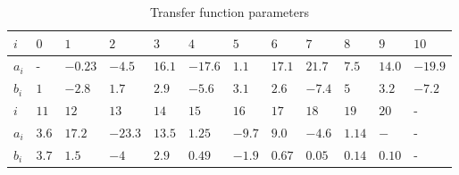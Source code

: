 \begin{table}[h!]
  \centering
  \begin{tabular}{| l | l | l | l | l | l | l | l | l | l | l | l |}
    \hline
    $i$   & $0$ & $1$ & $2$ & $3$ & $4$ & $5$ & $6$ & $7$ & $8$ & $9$ & $10$\\ \hline
    $a_i$ & -   & $-0.23$ & $-4.5$ & $16.1$ & $-17.6$ & $1.1$ & $17.1$ & $21.7$ & $7.5$ & $14.0$ & $-19.9$\\
    $b_i$ & $1$ & $-2.8$ & $1.7$ & $2.9$ & $-5.6$ & $3.1$ & $2.6$ & $-7.4$ & $5$ & $3.2$ & $-7.2$ \\ \hline
    $i$   & $11$ & $12$ & $13$ & $14$ & $15$ & $16$ & $17$ & $18$ & $19$ & $20$ & -\\ \hline
    $a_i$ & $3.6$ & $17.2$ & $-23.3$ & $13.5$ & $1.25$ & $-9.7$ & $9.0$ & $-4.6$ & $1.14$ & $-$ & - \\
    $b_i$ & $3.7$ & $1.5$ & $-4$ & $2.9$ & $0.49$ & $-1.9$ & $0.67$ & $0.05$ & $0.14$ & $0.10$ & - \\
    \hline
  \end{tabular}
  \caption{\label{tab:fdc_param} Transfer function parameters}
\end{table}
